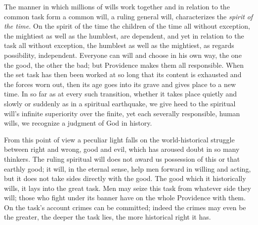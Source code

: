 \documentclass[12pt,a4paper,openany]{book}
\newcommand{\opage}[1]{\marginnote{\footnotesize\textit{[#1]}}}
\begin{document}
The manner in which millions of wills work together
and in relation to the common task form a common will,
a ruling general will, characterizes the \emph{spirit}
\emph{of the time.} On the spirit of the time the children of the time all without
exception, the mightiest as well as the humblest,
are dependent, and yet in relation to the task all without
exception, the humblest as well as the mightiest,
as regards possibility, independent. Everyone can
will and choose in his own way, the one the good, the
other the bad; but Providence makes them all responsible.
When the set task has then been worked at
so long that its content is exhausted and the forces worn out,
then its age goes into its grave and gives
\setcounter{footnote}{0}%
\opage{91}place to a new time. In so far as at every
such transition, whether it takes place quietly and slowly or
suddenly as in a spiritual earthquake, we give heed to the spiritual will's
infinite superiority over the finite, yet each
severally responsible, human wills, we recognize a judgment of God
in history.

From this point of view a peculiar light falls
on the world-historical struggle between right and wrong,
good and evil, which has aroused doubt in so many
thinkers. The ruling spiritual will does not award us
possession of this or that earthly good; it
will, in the eternal sense, help men forward in willing and acting, but it does not take sides directly with
the good. The good which it historically wills, it lays into
the great task. Men may seize this
task from whatever side they will; those who fight under
its banner have on the whole Providence with them. On the task's account
crimes can be committed; indeed
the crimes may even be the greater, the
deeper the task lies, the more historical right it has.
\end{document}
